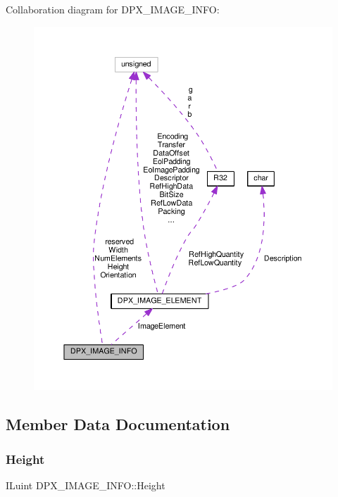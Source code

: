 Collaboration diagram for D\+P\+X\+\_\+\+I\+M\+A\+G\+E\+\_\+\+I\+N\+FO\+:
\nopagebreak
\begin{figure}[H]
\begin{center}
\leavevmode
\includegraphics[width=350pt]{d2/d04/structDPX__IMAGE__INFO__coll__graph}
\end{center}
\end{figure}


\subsection{Member Data Documentation}
\mbox{\label{structDPX__IMAGE__INFO_a5339d0d30260a254b3de422d02f18804}} 
\subsubsection{\texorpdfstring{Height}{Height}}
{\footnotesize\ttfamily I\+Luint D\+P\+X\+\_\+\+I\+M\+A\+G\+E\+\_\+\+I\+N\+F\+O\+::\+Height}



